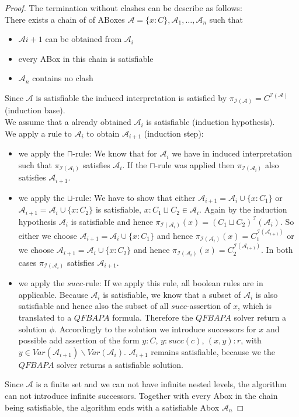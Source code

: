 \documentclass[a4paper,11pt]{scrartcl}
\theoremstyle{break}
\theoremstyle{definition}
\begin{document}
\begin{proof}
The termination without clashes can be describe as follows:\\
There exists a chain of of ABoxes $\mathcal{A}=\{x:C\},\mathcal{A}_1,\dots,\mathcal{A}_n$ such that
\begin{itemize}
\item $\mathcal{A}{i+1}$ can be obtained from $\mathcal{A}_i$
\item every ABox in this chain is satisfiable
\item $\mathcal{A}_n$ contains no clash
\end{itemize}
Since $\mathcal{A}$ is satisfiable the induced interpretation is satisfied by $\pi_{\mathcal{I}(\mathcal{A})}=C^{\mathcal{I}(\mathcal{A})}$ (induction base).\\
We assume that a already obtained $\mathcal{A}_i$ is satisfiable (induction hypothesis).\\
We apply a rule to $\mathcal{A}_i$ to obtain $\mathcal{A}_{i+1}$ (induction step):
\begin{itemize}
\item we apply the $\sqcap$-rule: We know that for $\mathcal{A}_i$ we have in induced interpretation such that $\pi_{\mathcal{I}(\mathcal{A}_i)}$ satisfies $\mathcal{A}_i$. If the $\sqcap$-rule was applied then $\pi_{\mathcal{I}(\mathcal{A}_i)}$ also satisfies $\mathcal{A}_{i+1}$.
\item we apply the $\sqcup$-rule: We have to show that either $\mathcal{A}_{i+1}=\mathcal{A}_i\cup\{x:C_1\}$ or $\mathcal{A}_{i+1}=\mathcal{A}_i\cup\{x:C_2\}$ is satisfiable, $x:C_1\sqcup C_2\in\mathcal{A}_i$. Again by the induction hypothesis $\mathcal{A}_i$ is satisfiable and hence $\pi_{\mathcal{I}(\mathcal{A}_i)}(x)=(C_1\sqcup C_2)^\mathcal{I}(\mathcal{A}_i)$. So either we choose $\mathcal{A}_{i+1}=\mathcal{A}_i\cup\{x:C_1\}$ and hence $\pi_{\mathcal{I}(\mathcal{A}_i)}(x)=C_1^{\mathcal{I}(\mathcal{A}_{i+1})}$ or we choose $\mathcal{A}_{i+1}=\mathcal{A}_i\cup\{x:C_2\}$ and hence $\pi_{\mathcal{I}(\mathcal{A}_i)}(x)=C_2^{\mathcal{I}(\mathcal{A}_{i+1})}$. In both cases $\pi_{\mathcal{I}(\mathcal{A}_i)}$ satisfies $\mathcal{A}_{i+1}$.
\item we apply the $succ$-rule: If we apply this rule, all boolean rules are in applicable. Because $\mathcal{A}_i$ is satisfiable, we know that a subset of $\mathcal{A}_i$ is also satisfiable and hence also the subset of all $succ$-assertion of $x$, which is translated to a $QFBAPA$ formula. Therefore the $QFBAPA$ solver return a solution $\phi$. Accordingly to the solution we introduce successors for $x$ and possible add assertion of the form $y:C$, $y:succ(c)$, $(x,y):r$, with $y\in Var(\mathcal{A}_{i+1})\backslash Var(\mathcal{A}_i)$. $\mathcal{A}_{i+1}$ remains satisfiable, because we the $QFBAPA$ solver returns a satisfiable solution.
\end{itemize}
Since $\mathcal{A}$ is a finite set and we can not have infinite nested levels, the algorithm can not introduce infinite successors. Together with every Abox in the chain being satisfiable, the algorithm ends with a satisfiable Abox $\mathcal{A}_n$
\end{proof}
\end{document}
